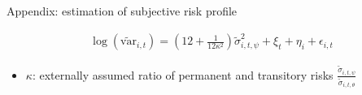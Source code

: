 \documentclass{beamer}
\begin{document}
\begin{frame}{Appendix: estimation of subjective risk profile}
	\label{appendix:RegimeEstimationDetail}
	
	\begin{equation*}
		\begin{split}
				\log(\tilde {\text{var}}_{i,t})= (12+\frac{1}{12\kappa^2})\tilde \sigma^2_{i,t,\psi} + \xi_{t}+\eta_{i}+ \epsilon_{i,t}
			\end{split}
	\end{equation*}
	\begin{itemize}
		
		\item $\kappa$: externally assumed ratio of permanent and transitory risks $\frac{\tilde \sigma_{i,t,\psi}}{\tilde \sigma_{i,t,\theta}}$
		\end{itemize}
	\hyperlink{RegimeEstimation}{} 
\end{frame}




\end{document}
